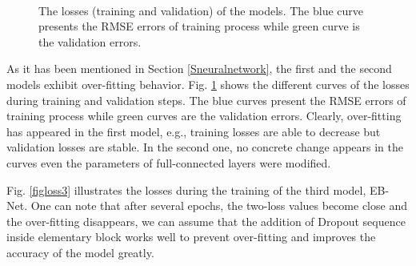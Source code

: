 \documentclass[review]{elsarticle}
\begin{document}
\begin{figure}[htbp]
    \centering
    ~~
\\    
    \caption{The losses (training and validation) of the models. The
      blue curve presents the RMSE errors of training process while
      green curve is the validation errors.}
    
    \label{figlosses}
\end{figure}
As it has been mentioned in Section \ref{Sneuralnetwork}, the first
and the second models exhibit over-fitting
behavior. Fig. \ref{figlosses} shows the different curves of the
losses during training and validation steps. The blue curves present
the RMSE errors of training process while green curves are the
validation errors. Clearly, over-fitting has appeared in the first
model, e.g., training losses are able to decrease but validation
losses are stable. In the second one, no concrete change appears in the curves even
the parameters of full-connected layers were modified.


Fig. \ref{figloss3} illustrates the losses during the training of the
third model, EB-Net. One can note that after several epochs, the
two-loss values become close and the over-fitting disappears, we can
assume that the addition of Dropout sequence inside elementary block works well to prevent
over-fitting and improves the accuracy of the model greatly.
\end{document}
